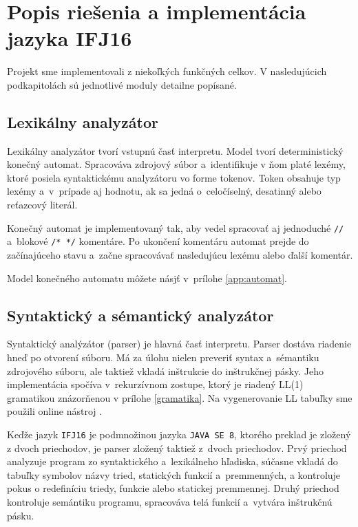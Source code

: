 \documentclass[11pt,a4paper]{article}
\begin{document}
\section{Popis riešenia a implementácia jazyka IFJ16}
\label{popis}

Projekt sme implementovali z niekoľkých funkčných celkov. V nasledujúcich podkapitolách sú jednotlivé moduly detailne popísané.

    \subsection{Lexikálny analyzátor}
    \label{lexer}
    Lexikálny analyzátor tvorí vstupnú časť interpretu. Model tvorí deterministický
    konečný automat. Spracováva zdrojový súbor a~identifikuje v ňom platé lexémy,
    ktoré posiela syntaktickému analyzátoru vo forme tokenov. Token obsahuje typ lexémy
    a~v~prípade aj hodnotu, ak sa jedná o~celočíselný, desatinný alebo reťazcový literál.

    Konečný automat je implementovaný tak, aby vedel spracovať aj jednoduché \texttt{//}
    a~blokové \texttt{/* */} komentáre. Po ukončení komentáru  automat prejde do
    začínajúceho stavu a~začne spracovávať nasledujúcu lexému alebo ďalší komentár.

    Model konečného automatu môžete násjť v~prílohe \ref{app:automat}.


    \subsection{Syntaktický a sémantický analyzátor}
    \label{parser}
    Syntaktický analýzátor (parser) je hlavná časť interpretu. Parser dostáva
    riadenie hneď po otvorení súboru. Má za úlohu nielen preveriť syntax
    a~sémantiku zdrojového súboru, ale taktiež vkladá inštrukcie do inštrukčnej
    pásky. Jeho implementácia spočíva v~rekurzívnom zostupe, ktorý je riadený
    LL(1) gramatikou znázorňenou v prílohe \ref{gramatika}. Na vygenerovanie
    LL tabuľky sme použili online nástroj \cite{aLLT}.

    Keďže jazyk \texttt{IFJ16} je podmnožinou jazyka \texttt{JAVA SE 8},
    ktorého preklad je zložený z dvoch priechodov, je parser zložený
    taktiež z~dvoch priechodov. Prvý priechod analyzuje program zo syntaktického
    a~lexikálneho hľadiska, súčasne vkladá do tabuľky symbolov názvy tried,
    statických funkcií a~premmenných, a kontroluje pokus o redefiníciu triedy,
    funkcie alebo statickej premmennej. Druhý priechod kontroluje semántiku
    programu, spracováva telá funkcií a~vytvára inštrukčnú pásku.
\end{document}
